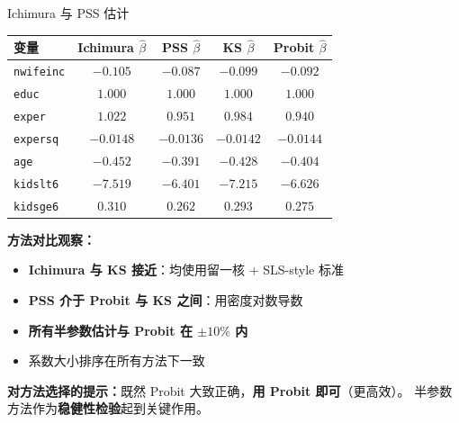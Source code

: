 \documentclass[aspectratio=169, 10pt]{beamer}
\begin{document}
\begin{frame}{Ichimura 与 PSS 估计}

  \begin{center}\footnotesize
  \begin{tabular}{l|c|c|c|c}
  \hline
  变量 & Ichimura $\hat\beta$ & PSS $\hat\beta$ & KS $\hat\beta$ & Probit $\hat\beta$ \\
  \hline
  \texttt{nwifeinc} & $-0.105$ & $-0.087$ & $-0.099$ & $-0.092$ \\
  \texttt{educ} & $1.000$ & $1.000$ & $1.000$ & $1.000$ \\
  \texttt{exper} & $1.022$ & $0.951$ & $0.984$ & $0.940$ \\
  \texttt{expersq} & $-0.0148$ & $-0.0136$ & $-0.0142$ & $-0.0144$ \\
  \texttt{age} & $-0.452$ & $-0.391$ & $-0.428$ & $-0.404$ \\
  \texttt{kidslt6} & $-7.519$ & $-6.401$ & $-7.215$ & $-6.626$ \\
  \texttt{kidsge6} & $0.310$ & $0.262$ & $0.293$ & $0.275$ \\
  \hline
  \end{tabular}
  \end{center}

  \begin{highlightbox}
    \textbf{方法对比观察：}
    \begin{itemize}\setlength{\itemsep}{1pt}
      \item \textbf{Ichimura 与 KS 接近}：均使用留一核 + SLS-style 标准
      \item \textbf{PSS 介于 Probit 与 KS 之间}：用密度对数导数
      \item \textbf{所有半参数估计与 Probit 在 $\pm 10\%$ 内}
      \item 系数大小排序在所有方法下一致
    \end{itemize}
  \end{highlightbox}

  \begin{keybox}
    \textbf{对方法选择的提示：}既然 Probit 大致正确，\textbf{用 Probit 即可}（更高效）。
    半参数方法作为\textbf{稳健性检验}起到关键作用。
  \end{keybox}

\end{frame}
\end{document}
